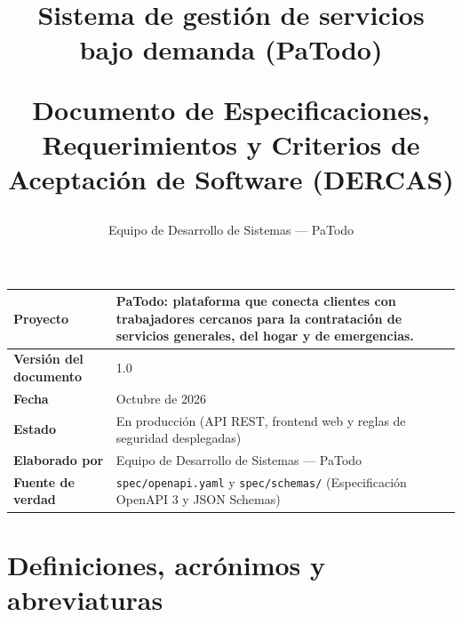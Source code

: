 \documentclass[doc,12pt,a4paper]{apa7}
\begin{document}
\renewcommand{\tablename}{Tabla}

\title{Sistema de gestión de servicios bajo demanda (PaTodo)\par
Documento de Especificaciones, Requerimientos y Criterios de Aceptación de Software (DERCAS)}
\author{Equipo de Desarrollo de Sistemas --- PaTodo}

\maketitle
\thispagestyle{otherpage}

\vspace*{2\baselineskip}
\noindent
\begin{tabular}{@{}P{4.2cm} L{9.5cm}@{}}
\toprule
\textbf{Proyecto} & PaTodo: plataforma que conecta clientes con trabajadores cercanos para la contratación de servicios generales, del hogar y de emergencias. \\
\midrule
\textbf{Versión del documento} & 1.0 \\
\midrule
\textbf{Fecha} & Octubre de 2026 \\
\midrule
\textbf{Estado} & En producción (API REST, frontend web y reglas de seguridad desplegadas) \\
\midrule
\textbf{Elaborado por} & Equipo de Desarrollo de Sistemas --- PaTodo \\
\midrule
\textbf{Fuente de verdad} & \texttt{spec/openapi.yaml} y \texttt{spec/schemas/} (Especificación OpenAPI 3 y JSON Schemas) \\
\bottomrule
\end{tabular}

\newpage

{\linespread{0.96}\selectfont\tableofcontents}
\newpage

\section{Definiciones, acrónimos y abreviaturas}
\end{document}
